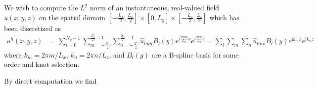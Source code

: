\documentclass[letterpaper,11pt,nointlimits,reqno]{amsart}
\newcommand{\ii}{\ensuremath{\mathrm{i}}}
\begin{document}
We wish to compute the $L^2$ norm of an instantaneous, real-valued field
$u\!\left(x,y,z\right)$ on the spatial domain
$\left[-\frac{L_x}{2},\frac{L_x}{2}\right] \times{} [0,L_y] \times{}
\left[-\frac{L_z}{2},\frac{L_z}{2}\right]$ which has been discretized as
\begin{align}
u^h(x,y,z)
&=
  \sum_{l=0}^{N_y - 1}
  \sum_{m=-\frac{N_x}{2}}^{\frac{N_x}{2}-1}
  \sum_{n=-\frac{N_z}{2}}^{\frac{N_z}{2}-1}
  \hat{u}_{l m n}
  B_l\!\left(y\right)
  e^{\ii\frac{2\pi{}m}{L_x}x}
  e^{\ii\frac{2\pi{}n}{L_z}z}
=
  \sum_{l}\sum_{m}\sum_{n}
  \hat{u}_{l m n}B_l\!\left(y\right)e^{\ii k_m x}e^{\ii k_n z}
\end{align}
where $k_m = 2\pi{}m/L_x$, $k_n = 2\pi{}n/L_z$, and $B_l\!\left(y\right)$ are a
B-spline basis for some order and knot selection.

By direct computation we find
\end{document}
